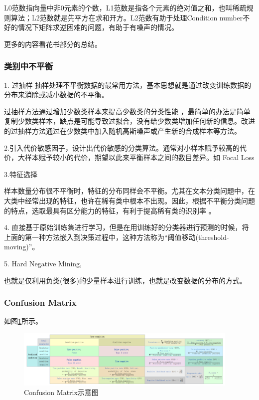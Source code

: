 L0范数指向量中非0元素的个数，L1范数是指各个元素的绝对值之和，也叫稀疏规则算法；L2范数就是先平方在求和开方。L2范数有助于处理Condition number不好的情况下矩阵求逆困难的问题，有助于有噪声的情况。

更多的内容看花书部分的总结。

\subsubsection{类别中不平衡}

1. 过抽样
抽样处理不平衡数据的最常用方法，基本思想就是通过改变训练数据的分布来消除或减小数据的不平衡。

过抽样方法通过增加少数类样本来提高少数类的分类性能 ，最简单的办法是简单复制少数类样本，缺点是可能导致过拟合，没有给少数类增加任何新的信息。改进的过抽样方法通过在少数类中加入随机高斯噪声或产生新的合成样本等方法。

2.引入代价敏感因子，设计出代价敏感的分类算法。通常对小样本赋予较高的代价，大样本赋予较小的代价，期望以此来平衡样本之间的数目差异。如 Focal Loss

3.特征选择

样本数量分布很不平衡时，特征的分布同样会不平衡。尤其在文本分类问题中，在大类中经常出现的特征，也许在稀有类中根本不出现。因此，根据不平衡分类问题的特点，选取最具有区分能力的特征，有利于提高稀有类的识别率 。

4. 直接基于原始训练集进行学习，但是在用训练好的分类器进行预测的时候，将上面的第一种方法嵌入到决策过程中，这种方法称为“阈值移动(threshold-moving)”。

5. Hard Negative Mining,

也就是仅利用负类(很多)的少量样本进行训练，也就是改变数据的分布的方式。

\subsubsection{Confusion Matrix}

如图\ref{ConfusionMatrix0}所示。

\begin{figure}[!hbtp]
\centering
\includegraphics[width=0.95\textwidth]{DLTips/ConfusionMatrix0.png}
\caption{Confusion Matrix示意图}
\label{ConfusionMatrix0}
\end{figure}

